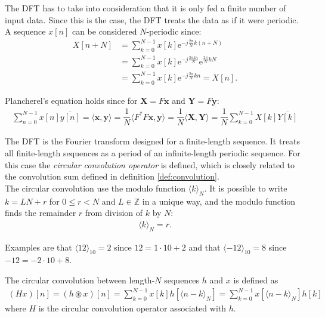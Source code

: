 The DFT has to take into consideration that it is only fed a finite number of input data. Since this is the case, the DFT treats the data as if it were periodic. A sequence $x[n]$ can be considered $N$-periodic since:
\begin{align*}
	X[n+N]
	&= \sum_{k=0}^{N-1} x[k] \text{e}^{-j \frac{2 \pi}{N}  k (n		+N)} \\
	&= \sum_{k=0}^{N-1} x[k] \text{e}^{-j \frac{2 \pi k n}{N}}		\text{e}^{\frac{2 \pi}{N} kN} \\
	&= \sum_{k=0}^{N-1} x[k] \text{e}^{-j \frac{2 \pi}{N} k n} 		= X[n].
\end{align*}

Plancherel's equation holds since for $\textbf{X} = F\textbf{x}$ and $\textbf{Y} = F\textbf{y}$:
\begin{align*}
\sum_{n=0}^{N-1} x[n] \overline{y[n]} = \langle \textbf{x},\textbf{y} \rangle = \dfrac{1}{N} \langle F^*F\textbf{x},\textbf{y} \rangle = \dfrac{1}{N} \langle \textbf{X},\textbf{Y} \rangle = \dfrac{1}{N} \sum_{k=0}^{N-1} X[k] \overline{Y[k]}
\end{align*}

The DFT is the Fourier transform designed for a finite-length sequence.
It treats all finite-length sequences as a period of an infinite-length periodic sequence.
For this case the \textit{circular convolution operator} is defined, which is closely related to the convolution sum defined in definition \ref{def:convolution}. \\
The circular convolution use the modulo function $\langle k\rangle_N$. It is possible to write $k = LN+r$ for $0 \leq r < N$ and $L \in \mathbb{Z}$ in a unique way, and the modulo function finds the remainder $r$ from division of $k$ by $N$:
\begin{align*}
\langle k \rangle_N = r.
\end{align*}

Examples are that $\langle 12 \rangle_{10} = 2$ since $12 = 1 \cdot 10 + 2$ and that $\langle -12 \rangle_{10} = 8$ since $-12 = -2 \cdot 10 + 8$.

\begin{definition}
 	The circular convolution between length-$N$ sequences $h$ 		and $x$ is defined as
	\begin{align*}
	(Hx)[n] = (h \circledast x)[n] = \sum_{k = 0}^{N-1} x[k] 		h[\langle n-k\rangle_N] =\sum_{k = 0}^{N-1} x[\langle n-k		\rangle_N] h[k]
	\end{align*}
	where $H$ is the circular convolution operator associated 		with $h$.
\end{definition}

